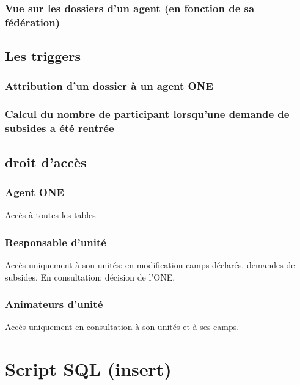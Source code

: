 \subsubsection{Vue sur les dossiers d'un agent (en fonction de sa fédération)}








\subsection{Les triggers}
\subsubsection{Attribution d'un dossier à un agent ONE}

\subsubsection{Calcul du nombre de participant lorsqu'une demande de subsides a été rentrée}




\subsection{droit d'accès}
\subsubsection{Agent ONE}
Accès à toutes les tables


\subsubsection{Responsable d'unité}
Accès uniquement à son unités: en modification camps déclarés, demandes de subsides. En consultation: décision de l'ONE. 



\subsubsection{Animateurs d'unité}
Accès uniquement en consultation à son unités et à ses camps. 










\section{Script SQL (insert)}